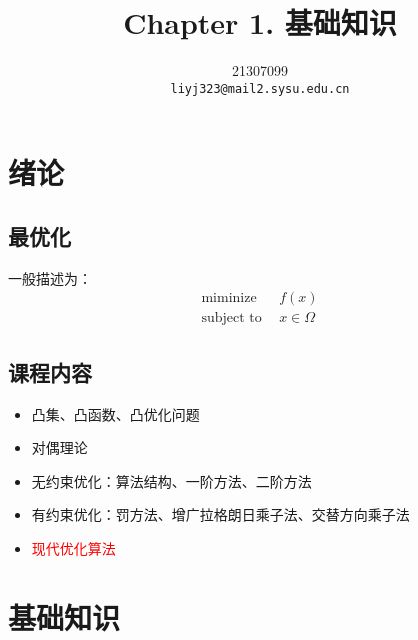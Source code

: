 \documentclass{mytemplate}
\title{Chapter 1. 基础知识}
\author{%
    21307099\\
    \texttt{liyj323@mail2.sysu.edu.cn} \\
}
\begin{document}
\maketitle
\section{绪论}
\subsection{最优化}
一般描述为：
\begin{align}
    \text{miminize}  \ \  & f(x)         \\
    \text{subject to}\ \  & x \in \Omega
\end{align}
\subsection{课程内容}
\begin{itemize}
    \item 凸集、凸函数、凸优化问题
    \item 对偶理论
    \item 无约束优化：算法结构、一阶方法、二阶方法
    \item 有约束优化：罚方法、增广拉格朗日乘子法、交替方向乘子法
    \item \textcolor{red}{现代优化算法}
\end{itemize}

\section{基础知识}
\end{document}
